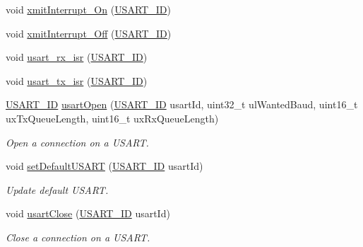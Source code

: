 \begin{DoxyCompactItemize}
\item 
void \hyperlink{group__usart_async_module_gaddeaba370b80a1dd990f7f713ba7303f}{xmit\+Interrupt\+\_\+\+On} (\hyperlink{group__usart_async_module_gaae3c5ea77a411e5f40e4377f77067b86}{U\+S\+A\+R\+T\+\_\+\+ID})
\item 
void \hyperlink{group__usart_async_module_ga47ace99c93e8f4b284443b758cab1523}{xmit\+Interrupt\+\_\+\+Off} (\hyperlink{group__usart_async_module_gaae3c5ea77a411e5f40e4377f77067b86}{U\+S\+A\+R\+T\+\_\+\+ID})
\item 
void \hyperlink{group__usart_async_module_ga6e2b4d1b6f5bd3b8cf8a9ad223ad348f}{usart\+\_\+rx\+\_\+isr} (\hyperlink{group__usart_async_module_gaae3c5ea77a411e5f40e4377f77067b86}{U\+S\+A\+R\+T\+\_\+\+ID})
\item 
void \hyperlink{group__usart_async_module_gacc2987796aa72246682121ad6686c67b}{usart\+\_\+tx\+\_\+isr} (\hyperlink{group__usart_async_module_gaae3c5ea77a411e5f40e4377f77067b86}{U\+S\+A\+R\+T\+\_\+\+ID})
\item 
\hyperlink{group__usart_async_module_gaae3c5ea77a411e5f40e4377f77067b86}{U\+S\+A\+R\+T\+\_\+\+ID} \hyperlink{group__usart_async_module_gae9acc73d962adef7e91a498618ff012f}{usart\+Open} (\hyperlink{group__usart_async_module_gaae3c5ea77a411e5f40e4377f77067b86}{U\+S\+A\+R\+T\+\_\+\+ID} usart\+Id, uint32\+\_\+t ul\+Wanted\+Baud, uint16\+\_\+t ux\+Tx\+Queue\+Length, uint16\+\_\+t ux\+Rx\+Queue\+Length)
\begin{DoxyCompactList}\small\item\em Open a connection on a U\+S\+A\+RT. \end{DoxyCompactList}\item 
void \hyperlink{group__usart_async_module_gaa679900a334c7873eb71c86fe52cbf40}{set\+Default\+U\+S\+A\+RT} (\hyperlink{group__usart_async_module_gaae3c5ea77a411e5f40e4377f77067b86}{U\+S\+A\+R\+T\+\_\+\+ID} usart\+Id)
\begin{DoxyCompactList}\small\item\em Update default U\+S\+A\+RT. \end{DoxyCompactList}\item 
void \hyperlink{group__usart_async_module_ga6343cf3035ec8972e44716a951a29d42}{usart\+Close} (\hyperlink{group__usart_async_module_gaae3c5ea77a411e5f40e4377f77067b86}{U\+S\+A\+R\+T\+\_\+\+ID} usart\+Id)
\begin{DoxyCompactList}\small\item\em Close a connection on a U\+S\+A\+RT. \end{DoxyCompactList}\item 

\end{DoxyCompactItemize}
